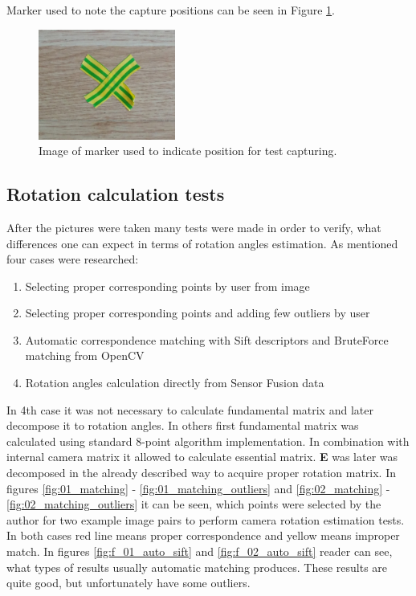 Marker used to note the capture positions can be seen in Figure \ref{fig:marker_env}.
\begin{figure}[h!]
    \centering
    \includegraphics[width=0.4\textwidth]{marker_env}
    \caption{Image of marker used to indicate position for test capturing.}
    \label{fig:marker_env}
\end{figure}

\subsection{Rotation calculation tests}
After the pictures were taken many tests were made in order to verify, what differences one can expect in terms of rotation angles estimation. As mentioned four cases were researched:
\begin{enumerate} \label{enum:rotation_calcs_types}
\item Selecting proper corresponding points by user from image
\item Selecting proper corresponding points and adding few outliers by user
\item Automatic correspondence matching with Sift descriptors and BruteForce matching from OpenCV
\item Rotation angles calculation directly from Sensor Fusion data
\end{enumerate}
In 4th case it was not necessary to calculate fundamental matrix and later decompose it to rotation angles. In others first fundamental matrix was calculated using standard 8-point algorithm implementation. In combination with internal camera matrix it allowed to calculate essential matrix. \textbf{E} was later was decomposed in the already described way to acquire proper rotation matrix. In figures \ref{fig:01_matching} - \ref{fig:01_matching_outliers} and \ref{fig:02_matching} - \ref{fig:02_matching_outliers} it can be seen, which points were selected by the author for two example image pairs to perform camera rotation estimation tests. In both cases red line means proper correspondence and yellow means improper match. In figures \ref{fig:f_01_auto_sift} and \ref{fig:f_02_auto_sift} reader can see, what types of results usually automatic matching produces. These results are quite good, but unfortunately have some outliers. 

